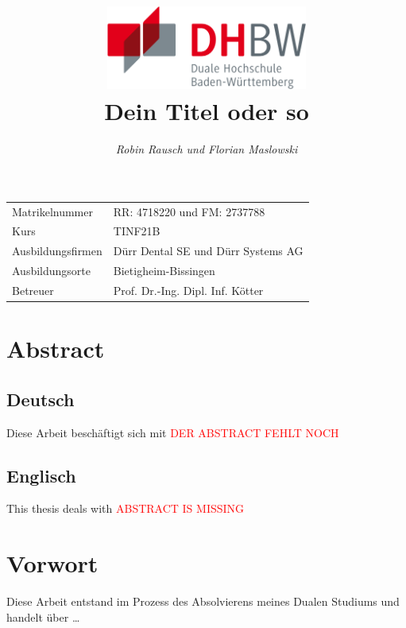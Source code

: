 \documentclass[12pt,a4paper]{article}
\author{\slshape Robin Rausch und Florian Maslowski}
\title{\includegraphics[height=2.75cm]{Bilder/dhbw_logo.png}\vspace{2cm}\\\textbf{Dein Titel oder so}}
\begin{document}
\pagestyle{titlepage}
\clearpage\maketitle
\thispagestyle{empty}
\vspace*{\fill}
\begin{center}
	\begin{tabularx}{\textwidth}{X X}
		Matrikelnummer & RR: 4718220 und FM: 2737788 \\
		Kurs & TINF21B \\
		Ausbildungsfirmen & Dürr Dental SE und Dürr Systems AG \\
		Ausbildungsorte & Bietigheim-Bissingen \\
		Betreuer & Prof. Dr.-Ing. Dipl. Inf. Kötter \\
	\end{tabularx}
\end{center}

\newpage
{}

\pagestyle{fancy_transition}
\section*{Abstract}
\subsection*{Deutsch}
Diese Arbeit beschäftigt sich mit \textcolor{red}{DER ABSTRACT FEHLT NOCH}

\subsection*{Englisch}
This thesis deals with \textcolor{red}{ABSTRACT IS MISSING}

\newpage
\section*{Vorwort}
Diese Arbeit entstand im Prozess des Absolvierens meines Dualen Studiums und handelt über \dots

\newpage
\end{document}
